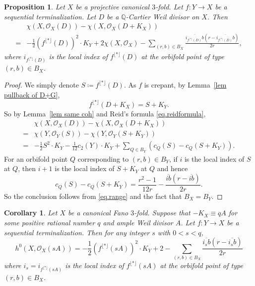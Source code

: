 \documentclass[12pt,twoside]{amsart}
\newtheorem{prop}[thm]{Proposition}
\newtheorem{cor}[thm]{Corollary}
\theoremstyle{definition}
\begin{document}
\begin{prop}\label{prop.rr.new}
    Let $X$ be a projective canonical $3$-fold. Let $f\colon Y\to X$ be a sequential terminalization. Let $D$ be a $\mathbb{Q}$-Cartier Weil divisor on $X$. Then
    \begin{align*}
        {}&\chi(X, \mathcal{O}_X(D))-\chi(X, \mathcal{O}_X(D+K_X))\\
        ={}&-\frac{1}{2}(f^{\lfloor *\rfloor}(D))^2\cdot K_Y+2\chi(X, \mathcal{O}_X)-\sum_{(r, b)\in B_X}\frac{\overline{ i_{f^{\lfloor *\rfloor}(D)} b}(r-\overline{i_{f^{\lfloor *\rfloor}(D)}b})}{2r},
    \end{align*}
    where $i_{f^{\lfloor *\rfloor}(D)} $ is the local index of ${f^{\lfloor *\rfloor}(D)}$ at the orbifold point of type $(r,b)\in B_X$.
\end{prop}

\begin{proof}
    We simply denote $S\coloneq f^{\lfloor *\rfloor}(D)$. As $f$ is crepant, by Lemma~\ref{lem pullback of D+G}, 
    \[
        f^{\lfloor *\rfloor}(D+K_X)={S}+K_Y.
    \] 
    So by Lemma~\ref{lem same coh} and Reid's formula \eqref{eq.reidformula},
    \begin{align*}
        {}&\chi(X, \mathcal{O}_X(D))-\chi(X, \mathcal{O}_X(D+K_X))\\
        ={}&\chi(Y, \mathcal{O}_Y(S))-\chi(Y, \mathcal{O}_Y(S+K_Y))\\
        ={}&-\frac{1}{2}S^2\cdot K_Y-\frac{1}{12}c_2(Y)\cdot K_Y+\sum_{Q\in B_Y}(c_Q(S)-c_Q(S+K_Y)).
    \end{align*} 
    For an orbifold point $Q$ corresponding to $(r, b)\in B_Y$, if $i$ is the local index of $S$ at $Q$, then $i+1$ is the local index of $S+K_Y$ at $Q$ and hence
    \[
        c_Q(S)-c_Q(S+K_Y)= \frac{r^2-1}{12r}-\frac{\overline{ib}(r-\overline{ib})}{2r}.
    \]
    So the conclusion follows from \eqref{eq.range} and the fact that $B_X=B_Y$.
\end{proof}

\begin{cor}\label{cor.rr.sA}
    Let $X$ be a canonical Fano $3$-fold. Suppose that $-K_X\equiv qA$ for some positive rational number $q$ and ample Weil divisor $A$. Let $f\colon Y\to X$ be a sequential terminalization. Then for any integer $s$ with $0<s<q$,
    \[
        h^0(X,\mathcal O_X(sA))= 
        -\frac{1}{2}(f^{\lfloor *\rfloor}(sA))^2\cdot K_Y+2-\sum_{(r,b)\in B_X}\frac{\overline{i_sb}(r-\overline{i_sb})}{2r}
    \]
    where $i_s=i_{f^{\lfloor *\rfloor}(sA)} $ is the local index of ${f^{\lfloor *\rfloor}(sA)}$ at the orbifold point of type $(r,b)\in B_X$.
\end{cor}
\end{document}
